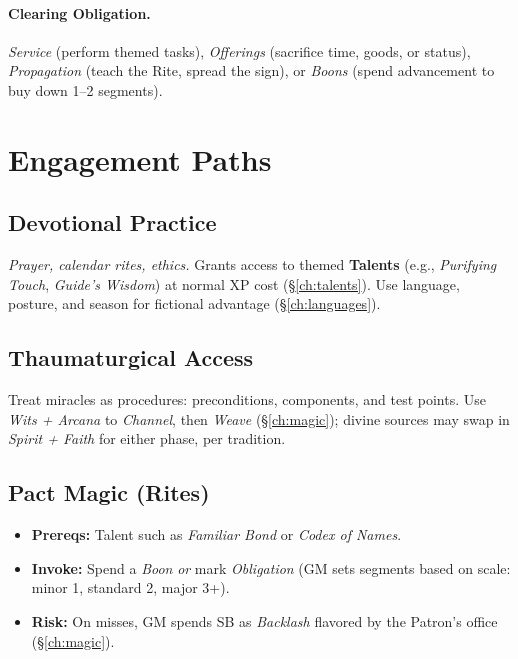 \begin{multicols}{2}
\paragraph{Clearing Obligation.}
\emph{Service} (perform themed tasks), \emph{Offerings} (sacrifice time, goods, or status), \emph{Propagation} (teach the Rite, spread the sign), or \emph{Boons} (spend advancement to buy down 1--2 segments).

\section{Engagement Paths}

\subsection*{Devotional Practice}
\emph{Prayer, calendar rites, ethics.} Grants access to themed \textbf{Talents} (e.g., \emph{Purifying Touch}, \emph{Guide’s Wisdom}) at normal XP cost (\S\ref{ch:talents}). Use language, posture, and season for fictional advantage (\S\ref{ch:languages}).

\subsection*{Thaumaturgical Access}
Treat miracles as procedures: preconditions, components, and test points. Use \emph{Wits + Arcana} to \emph{Channel}, then \emph{Weave} (\S\ref{ch:magic}); divine sources may swap in \emph{Spirit + Faith} for either phase, per tradition.

\subsection*{Pact Magic (Rites)}
\begin{itemize}
  \item \textbf{Prereqs:} Talent such as \emph{Familiar Bond} or \emph{Codex of Names}. 
  \item \textbf{Invoke:} Spend a \emph{Boon} \emph{or} mark \emph{Obligation} (GM sets segments based on scale: minor 1, standard 2, major 3+).
  \item \textbf{Risk:} On misses, GM spends SB as \emph{Backlash} flavored by the Patron’s office (\S\ref{ch:magic}).
\end{itemize}


\end{multicols}
